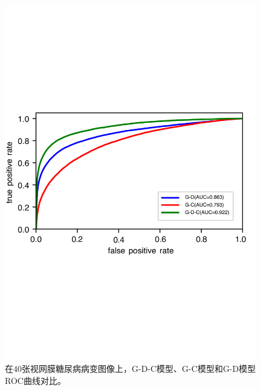 \begin{figure}[H]
	\centering
	\includegraphics[width=0.98\textwidth]{figure/ROC_u_d_u_c_u_d_c_components}
	\caption[G-D-C模型、G-C模型和G-D模型ROC曲线对比]{在$40$张视网膜糖尿病病变图像上，G-D-C模型、G-C模型和G-D模型ROC曲线对比。}
	\label{fig:roc_u_d_u_c_u_d_c_components}
\end{figure}
\endinput
